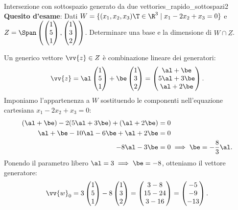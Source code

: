 \begin{esempio}{Intersezione con sottospazio generato da due vettori}{es_rapido_sottospazi2}
\textbf{Quesito d'esame}: Dati $W = \{ (x_1, x_2, x_3)\T \in \R^3 \mid x_1 - 2x_2 + x_3 = 0 \}$ e $Z = \Span\left( \begin{pmatrix} 1 \\ 5 \\ 1 \end{pmatrix}, \begin{pmatrix} 1 \\ 3 \\ 2 \end{pmatrix} \right)$. Determinare una base e la dimensione di $W \cap Z$.

\begin{dimostrazione}[Risoluzione]
Un generico vettore $\vv{z} \in Z$ è combinazione lineare dei generatori:
\begin{equation}
    \vv{z} = \al \begin{pmatrix} 1 \\ 5 \\ 1 \end{pmatrix} + \be \begin{pmatrix} 1 \\ 3 \\ 2 \end{pmatrix} = \begin{pmatrix} \al + \be \\ 5\al + 3\be \\ \al + 2\be \end{pmatrix}.
\end{equation}
Imponiamo l'appartenenza a $W$ sostituendo le componenti nell'equazione cartesiana $x_1 - 2x_2 + x_3 = 0$:
\begin{align}
    (\al + \be) - 2(5\al + 3\be) + (\al + 2\be) &= 0 \notag \\
    \al + \be - 10\al - 6\be + \al + 2\be &= 0 \notag \\
    -8\al - 3\be &= 0 \implies \be = -\frac{8}{3}\al.
\end{align}
Ponendo il parametro libero $\al = 3 \implies \be = -8$, otteniamo il vettore generatore:
\begin{equation}
    \vv{w}_0 = 3 \begin{pmatrix} 1 \\ 5 \\ 1 \end{pmatrix} - 8 \begin{pmatrix} 1 \\ 3 \\ 2 \end{pmatrix} = \begin{pmatrix} 3 - 8 \\ 15 - 24 \\ 3 - 16 \end{pmatrix} = \begin{pmatrix} -5 \\ -9 \\ -13 \end{pmatrix}.

\end{equation}
\end{dimostrazione}
\end{esempio}
